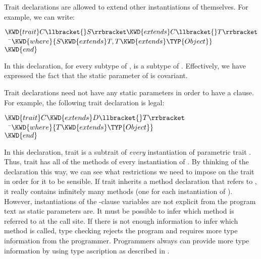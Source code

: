 Trait declarations are allowed to extend other instantiations of
themselves. For example, we can write:
\begin{Fortress}
\(\KWD{trait} C\llbracket{}S\rrbracket \KWD{extends} C\llbracket{}T\rrbracket\)\\
{\tt~~}\pushtabs\=\+\(  \KWD{where} \{S \KWD{extends} T, T \KWD{extends} \TYP{Object}\}\)\-\\\poptabs
\(\KWD{end}\)
\end{Fortress}
In this declaration, for every subtype  of , 
is a subtype of . Effectively, we have expressed
  the fact that the static parameter  of  is covariant.


Trait declarations need not have any static parameters in order
to have a  clause. For example, the following trait
declaration is legal:
\begin{Fortress}
\(\KWD{trait} C \KWD{extends} D\llbracket{}T\rrbracket\)\\
{\tt~~}\pushtabs\=\+\(  \KWD{where} \{T \KWD{extends} \TYP{Object}\}\)\-\\\poptabs
\(\KWD{end}\)
\end{Fortress}
In this declaration, trait  is a subtrait of \emph{every}
instantiation of parametric trait . Thus, trait  has all
of the methods of every instantiation of . By thinking of the
declaration this way, we can see what restrictions we need to impose on
the trait  in order for it to be sensible. If trait
 inherits a method declaration that refers to , it really
contains infinitely many methods (one for each instantiation of ).
However, instantiations of the -clause variables are not
explicit from the program text as static parameters are.
It must be possible to infer which method is referred to at the call site.
If there is not enough information to infer which method is called,
type checking rejects the
program and requires more type information from the programmer.
Programmers always can provide more type information by using type
ascription as described in .


